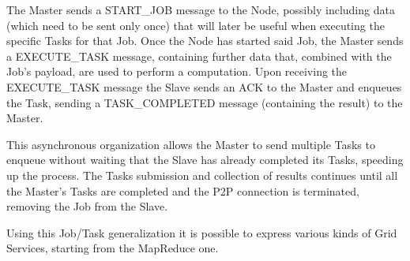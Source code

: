 The Master sends a START\_JOB message to the Node, possibly including data (which need to be sent only once) that will later be useful when executing the specific Tasks for that Job. Once the Node has started said Job, the Master sends a EXECUTE\_TASK message, containing further data that, combined with the Job's payload, are used to perform a computation. Upon receiving the EXECUTE\_TASK message the Slave sends an ACK to the Master and enqueues the Task, sending a TASK\_COMPLETED message (containing the result) to the Master.

This asynchronous organization allows the Master to send multiple Tasks to enqueue without waiting that the Slave has already completed its Tasks, speeding up the process.
The Tasks submission and collection of results continues until all the Master's Tasks are completed and the P2P connection is terminated, removing the Job from the Slave.

Using this Job/Task generalization it is possible to express various kinds of Grid Services, starting from the MapReduce one.